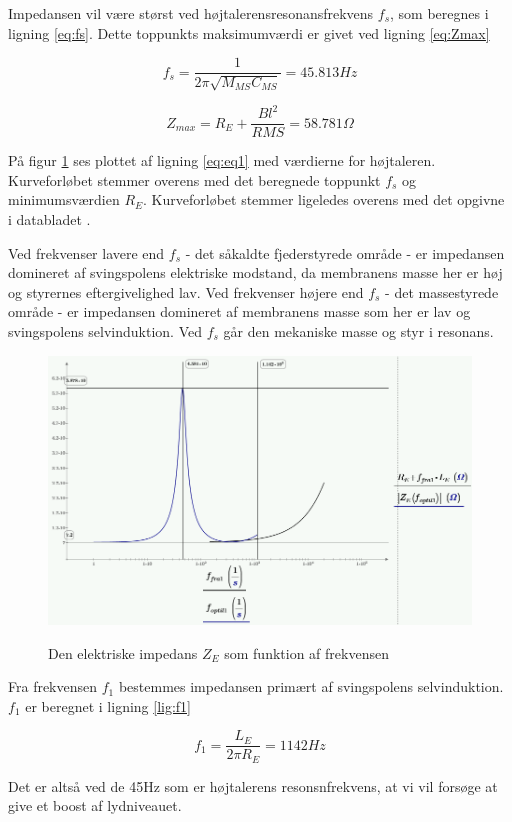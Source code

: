 Impedansen vil være størst ved højtalerensresonansfrekvens $f_s$, som beregnes i ligning \ref{eq:fs}. Dette toppunkts maksimumværdi er givet ved ligning \ref{eq:Zmax} 

\begin{equation}\label{eq:fs}
	f_s=\frac{1}{2 \pi \sqrt{M_{MS} C_{MS}}}=45.813Hz
\end{equation}

\begin{equation}\label{eq:Zmax}
	Z_{max}=R_E+\frac{Bl^2}{R{MS}}=58.781\Omega
\end{equation}

På figur \ref{fig:ZE_graf} ses plottet af ligning \ref{eq:eq1} med værdierne for højtaleren. Kurveforløbet stemmer overens med det beregnede toppunkt $f_s$ og minimumsværdien $R_E$. Kurveforløbet stemmer ligeledes overens med det opgivne i databladet \citep{FW168}.

Ved frekvenser lavere end $f_s$ - det såkaldte fjederstyrede område - er impedansen domineret af svingspolens elektriske modstand, da membranens masse her er høj og styrernes eftergivelighed lav. Ved frekvenser højere end $f_s$ - det massestyrede område - er impedansen domineret af membranens masse som her er lav og svingspolens selvinduktion. Ved $f_s$ går den mekaniske masse og styr i resonans.


\begin{figure}[H]
	\centering
	\includegraphics[width=\textwidth]{Pics/ZE_graf.PNG}
	\label{fig:ZE_graf}
	\caption{Den elektriske impedans $Z_E$ som funktion af frekvensen} 
\end{figure}

Fra frekvensen $f_1$ bestemmes impedansen primært af svingspolens selvinduktion. $f_1$ er beregnet i ligning \ref{lig:f1}

\begin{equation}\label{lig:f1}
f_1=\frac{L_E}{2 \pi R_E}=1142Hz
\end{equation}

Det er altså ved de 45Hz som er højtalerens resonsnfrekvens, at vi vil forsøge at give et boost af lydniveauet.
